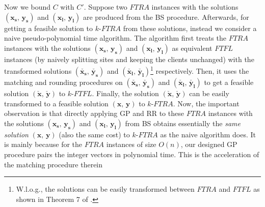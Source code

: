 \documentclass[10pt]{llncs}
\begin{document}
Now we bound $C$ with $C'$. Suppose two $FTRA$ instances with the
solutions $\left(\boldsymbol{x_{s}},\,\boldsymbol{y_{s}}\right)$
and $\left(\boldsymbol{x_{l}},\,\boldsymbol{y_{l}}\right)$ are produced
from the BS procedure. Afterwards, for getting a feasible solution
to $k$-$FTRA$ from these solutions, instead we consider a naive
pseudo-polynomial time algorithm. The algorithm first treats the $FTRA$
instances with the solutions $\left(\boldsymbol{x_{s}},\,\boldsymbol{y_{s}}\right)$
and $\left(\boldsymbol{x_{l}},\,\boldsymbol{y_{l}}\right)$ as equivalent
$FTFL$ instances (by naively splitting sites and keeping the clients
unchanged) with the transformed solutions $\left(\check{\boldsymbol{x_{s}}},\,\check{\boldsymbol{y_{s}}}\right)$
and $\left(\check{\boldsymbol{x_{l}}},\,\check{\boldsymbol{y_{l}}}\right)$\footnote{W.l.o.g., the solutions can be easily transformed between $FTRA$
and $FTFL$ as shown in Theorem 7 of \cite{kewen2011cocoon}. } respectively. Then, it uses the matching and rounding procedures
\cite{Swamy08FTFL2.076} on $\left(\check{\boldsymbol{x_{s}}},\,\check{\boldsymbol{y_{s}}}\right)$
and $\left(\check{\boldsymbol{x_{l}}},\,\check{\boldsymbol{y_{l}}}\right)$
to get a feasible solution $\left(\check{\boldsymbol{x}},\,\check{\boldsymbol{y}}\right)$
to $k$-$FTFL$. Finally, the solution $\left(\check{\boldsymbol{x}},\,\check{\boldsymbol{y}}\right)$
can be easily transformed to a feasible solution $\left(\boldsymbol{x},\,\boldsymbol{y}\right)$
to $k$-$FTRA$. Now, the important observation is that directly applying
GP and RR to these $FTRA$ instances with the solutions $\left(\boldsymbol{x_{s}},\,\boldsymbol{y_{s}}\right)$
and $\left(\boldsymbol{x_{l}},\,\boldsymbol{y_{l}}\right)$ from BS
obtains essentially the \textit{same solution} $\left(\boldsymbol{x},\,\boldsymbol{y}\right)$
(also the same cost) to $k$-$FTRA$ as the naive algorithm does.
It is mainly because for the $FTRA$ instances of size $O\left(n\right)$,
our designed GP procedure pairs the integer vectors in polynomial
time. This is the acceleration of the matching procedure therein \cite{Swamy08FTFL2.076}
\end{document}
